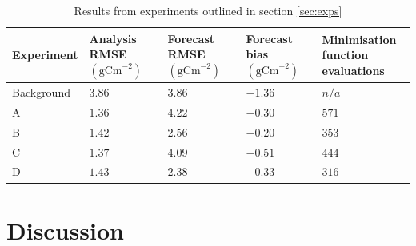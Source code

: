 \documentclass[11pt]{article}
\begin{document}
\begin{table}[ht] 
\begin{center}
	\begin{tabular}{| l | l | l | l | l |}
	\hline
	Experiment & \pbox{5cm}{Analysis RMSE \\ $( \text{gCm}^{-2})$} & \pbox{5cm}{Forecast RMSE \\ $( \text{gCm}^{-2})$} & \pbox{5cm}{Forecast bias \\ $( \text{gCm}^{-2})$} & \pbox{5cm}{Minimisation function \\ evaluations} \\ \hline
	Background & $3.86$ & $3.86$ & $-1.36$ & $n/a$ \\ \hline
	A & $1.36$ & $4.22$ & $-0.30$ & $571$ \\ \hline
	B & $1.42$ & $2.56$ & $-0.20$ & $353$  \\ \hline
	C & $1.37$ & $4.09$ & $-0.51$ & $444$ \\ \hline
	D & $1.43$ & $2.38$ & $-0.33$ & $316$ \\ 
	\hline
	\end{tabular}
	\caption{Results from experiments outlined in section  \ref{sec:exps}}
	\label{table:exps_tab}
\end{center} 
\end{table}


\section{Discussion}
\end{document}
